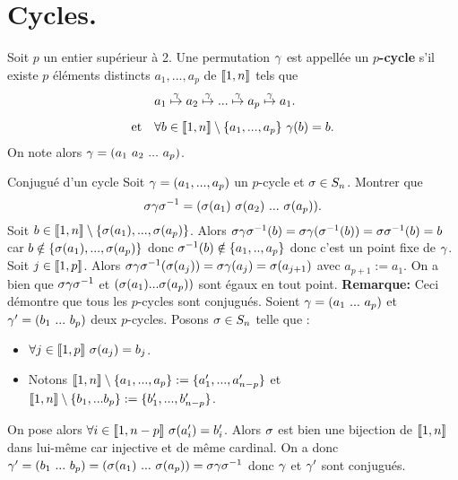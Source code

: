 \documentclass[11pt]{article}
\begin{document}
\section{Cycles.}

\begin{defi}{}{}
    Soit $p$ un entier supérieur à 2.\n
    Une permutation $\gamma$ est appellée un $p$\textbf{-cycle} s'il existe $p$ éléments distincts $a_1,...,a_p$ de $\llbracket1,n\rrbracket$ tels que
    \begin{align*}
        &a_1\overset{\g}{\mapsto}a_2\overset{\g}{\mapsto}...\overset{\g}{\mapsto}a_p\overset{\g}{\mapsto}a_1.\n
        \text{et} \quad &\forall b \in \lb1,n\rb\setminus\{a_1,...,a_p\} ~ \g(b)=b.
    \end{align*}
    On note alors $\gamma=(a_1~a_2~...~a_p)$.
\end{defi}


\begin{ex}{Conjugué d'un cycle}{}
    Soit $\gamma=(a_1,...,a_p)$ un $p$-cycle et $\sigma\in S_n$. Montrer que
    \begin{equation*}
        \sigma\gamma\sigma^{-1}=(\sigma(a_1)~\sigma(a_2)~...~\sigma(a_p)).
    \end{equation*}
    \tcblower
    Soit $b\in\llbracket1,n\rrbracket\setminus\{\sigma(a_1),...,\sigma(a_p)\}$.\n
    Alors $\sigma\gamma\sigma^{-1}(b)=\sigma\gamma(\sigma^{-1}(b))=\sigma\sigma^{-1}(b)=b$ car $b\notin\{\sigma(a_1),...,\sigma(a_p)\}$ donc $\sigma^{-1}(b)\notin\{a_1,..,a_p\}$ donc c'est un point fixe de $\gamma$.\n
    Soit $j\in\llbracket1,p\rrbracket$.\n
    Alors $\sigma\gamma\sigma^{-1}(\sigma(a_j))=\sigma\gamma(a_j)=\sigma(a_{j+1})$ avec $a_{p+1}:=a_1$.\n
    On a bien que $\sigma\gamma\sigma^{-1}$ et $(\sigma(a_1)...\sigma(a_p))$ sont égaux en tout point.\n
    \textbf{Remarque:} Ceci démontre que tous les $p$-cycles sont conjugués.\n
    Soient $\gamma=(a_1~...~a_p)$ et $\gamma'=(b_1~...~b_p)$ deux $p$-cycles.\n
    Posons $\sigma\in S_n$ telle que :
    \begin{itemize}
        \item $\forall j \in \llbracket 1, p \rrbracket ~ \sigma(a_j) = b_j$.
        \item Notons $\llbracket 1, n \rrbracket \setminus \{a_1, ..., a_p\} := \{a_1', ..., a_{n-p}'\}$ et $\llbracket 1, n \rrbracket \setminus \{b_1, ... b_p\} := \{b_1', ... , b_{n-p}'\}$.
    \end{itemize}
    On pose alors $\forall i\in\llbracket1,n-p\rrbracket ~ \sigma(a_i')=b_i'$.\n
    Alors $\sigma$ est bien une bijection de $\llbracket1,n\rrbracket$ dans lui-même car injective et de même cardinal.\n
    On a donc $\gamma'=(b_1~...~b_p) = (\sigma(a_1)~...~\sigma(a_p))=\sigma\gamma\sigma^{-1}$ donc $\gamma$ et $\gamma'$ sont conjugués.
\end{ex}
\end{document}
